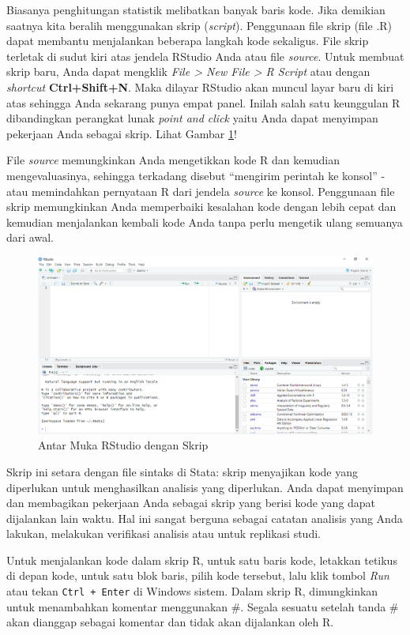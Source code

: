 \documentclass[a4paper, nobind]{templates/ociamthesis}
\begin{document}
Biasanya penghitungan statistik melibatkan banyak baris kode. Jika demikian saatnya kita beralih menggunakan skrip (\emph{script}). Penggunaan file skrip (file .R) dapat membantu menjalankan beberapa langkah kode sekaligus. File skrip terletak di sudut kiri atas jendela RStudio Anda atau file \emph{source}. Untuk membuat skrip baru, Anda dapat mengklik \emph{File \textgreater{} New File \textgreater{} R Script} atau dengan \emph{shortcut} \textbf{Ctrl+Shift+N}. Maka dilayar RStudio akan muncul layar baru di kiri atas sehingga Anda sekarang punya empat panel. Inilah salah satu keunggulan R dibandingkan perangkat lunak \emph{point and click} yaitu Anda dapat menyimpan pekerjaan Anda sebagai skrip. Lihat Gambar \ref{fig:4qu}!

File \emph{source} memungkinkan Anda mengetikkan kode R dan kemudian mengevaluasinya, sehingga terkadang disebut ``mengirim perintah ke konsol'' - atau memindahkan pernyataan R dari jendela \emph{source} ke konsol. Penggunaan file skrip memungkinkan Anda memperbaiki kesalahan kode dengan lebih cepat dan kemudian menjalankan kembali kode Anda tanpa perlu mengetik ulang semuanya dari awal.

\begin{figure}[H]
\includegraphics[width=1\linewidth]{figures/4qu} \caption{Antar Muka RStudio dengan Skrip}\label{fig:4qu}
\end{figure}

Skrip ini setara dengan file sintaks di Stata: skrip menyajikan kode yang diperlukan untuk menghasilkan analisis yang diperlukan. Anda dapat menyimpan dan membagikan pekerjaan Anda sebagai skrip yang berisi kode yang dapat dijalankan lain waktu. Hal ini sangat berguna sebagai catatan analisis yang Anda lakukan, melakukan verifikasi analisis atau untuk replikasi studi.

Untuk menjalankan kode dalam skrip R, untuk satu baris kode, letakkan tetikus di depan kode, untuk satu blok baris, pilih kode tersebut, lalu klik tombol \emph{Run} atau tekan \texttt{Ctrl\ +\ Enter} di Windows sistem. Dalam skrip R, dimungkinkan untuk menambahkan komentar menggunakan \#. Segala sesuatu setelah tanda \# akan dianggap sebagai komentar dan tidak akan dijalankan oleh R.
\end{document}
